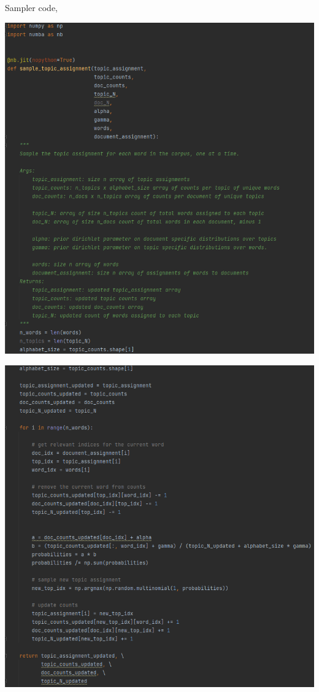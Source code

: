 \documentclass[10pt]{homeworg}
\begin{document}
\newpage

Sampler code,

\begin{center}
\includegraphics[scale=0.6]{figures/sampler_code_1.png}
\end{center}

\begin{center}
\includegraphics[scale=0.6]{figures/sampler_code_2.png}
\end{center}
\end{document}
